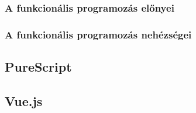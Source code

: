 \documentclass[12pt]{article}
\newtheorem{definíció}[theorem]{Definíció}
\begin{document}
\subsubsection{A funkcionális programozás előnyei}

\subsubsection{A funkcionális programozás nehézségei}

\subsection{PureScript}

\subsection{Vue.js}





\end{document}
